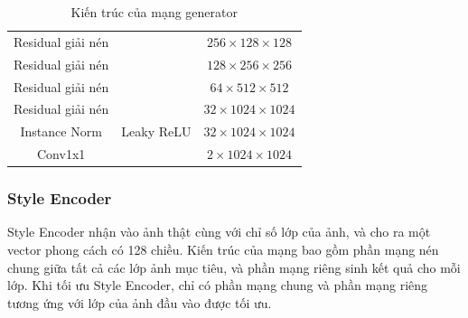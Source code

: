 \documentclass[12pt]{extreport}
\begin{document}
\begin{table}[H]
\begin{tabular}{c c c}
        Residual giải nén &               & $ 256 \times 128 \times 128 $  \\
        Residual giải nén &               & $ 128 \times 256 \times 256 $  \\
        Residual giải nén &               & $ 64 \times 512 \times 512 $   \\
        Residual giải nén &               & $ 32 \times 1024 \times 1024 $ \\
        Instance Norm     & Leaky ReLU    & $ 32 \times 1024 \times 1024 $ \\
        Conv1x1           &               & $ 2 \times 1024 \times 1024 $  \\
    \end{tabular}
    \caption{Kiến trúc của mạng generator}
\end{table}

\subsubsection{Style Encoder}

Style Encoder nhận vào ảnh thật cùng với chỉ số lớp của ảnh, và cho ra một vector phong cách có 128 chiều. Kiến trúc của mạng bao gồm phần mạng nén chung giữa tất cả các lớp ảnh mục tiêu, và phần mạng riêng sinh kết quả cho mỗi lớp. Khi tối ưu Style Encoder, chỉ có phần mạng chung và phần mạng riêng tương ứng với lớp của ảnh đầu vào được tối ưu.
\end{document}
